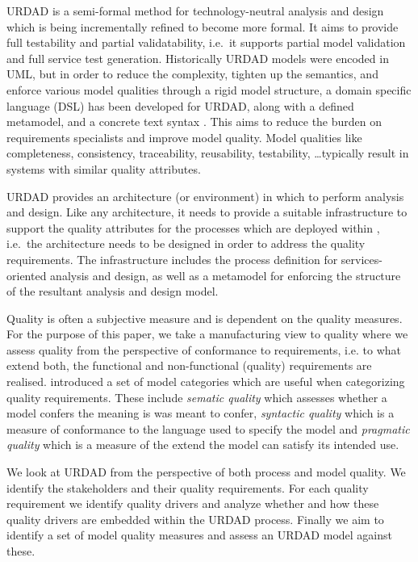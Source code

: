 URDAD is a semi-formal method for technology-neutral analysis and design \cite{solms_urdad_2010} which is being incrementally refined to become more formal. It aims to provide full testability and partial validatability, i.e.\ it supports partial model validation and full service test generation. Historically URDAD models were encoded in UML, but in order to reduce the complexity, tighten up the semantics, and enforce various model qualities through a rigid model structure, a domain specific language (DSL) has been developed for URDAD, along with a defined metamodel, and a concrete text syntax \cite{solmsfritz_domain-specific_????}. This aims to reduce the burden on requirements specialists and improve model quality. Model qualities like completeness, consistency, traceability, reusability, testability, \dots typically result in systems with similar quality attributes\cite{findItIfYouCan}.

URDAD provides an architecture (or environment) in which to perform analysis and design. Like any architecture, it needs to provide a suitable infrastructure to support the quality attributes for the processes which are deployed within \cite{}, i.e.\ the architecture needs to be designed in order to address the quality requirements. The infrastructure includes the process definition for services-oriented analysis and design, as well as a metamodel for enforcing the structure of the resultant analysis and design model.

Quality is often a subjective measure and is dependent on the quality measures. For the purpose of this paper, we take a manufacturing view \cite{garvin_what_1984} to quality where we assess quality from the perspective of conformance to requirements, i.e. to what extend both, the functional and non-functional (quality) requirements are realised. \cite{Linland} introduced a set of model categories which are useful when categorizing quality requirements. These include \emph{sematic quality} which assesses whether a model confers the meaning is was meant to confer, \emph{syntactic quality} which is a measure of conformance to the language used to specify the model and \emph{pragmatic quality} which is a measure of the extend the model can satisfy its intended use.

We look at URDAD from the perspective of both process and model quality. We identify the stakeholders and their quality requirements. For each quality requirement we identify quality drivers and analyze whether and how these quality drivers are embedded within the URDAD process. Finally we aim to identify a set of model quality measures and assess an URDAD model against these.
